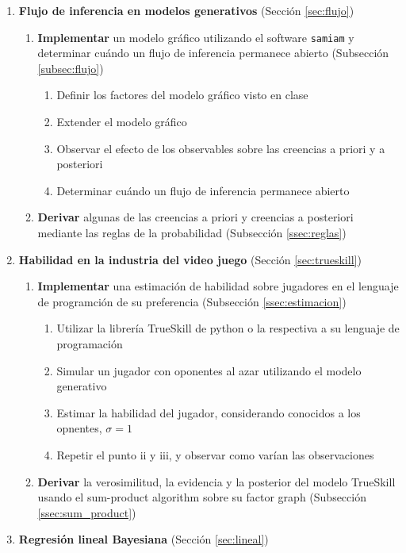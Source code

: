 \documentclass[a4paper,10pt]{article}
\begin{document}
\begin{enumerate}
 \item \textbf{Flujo de inferencia en modelos generativos} (Secci\'on \ref{sec:flujo})
 \begin{enumerate}
  \item \textbf{Implementar} un modelo gr\'afico utilizando el software \texttt{samiam} y determinar cuándo un flujo de inferencia permanece abierto (Subsecci\'on \ref{subsec:flujo})
  \begin{enumerate}[i]
  \item Definir los factores del modelo gr\'afico visto en clase
  \item Extender el modelo gr\'afico
  \item Observar el efecto de los observables sobre las creencias a priori y a posteriori
  \item Determinar cu\'ando un flujo de inferencia permanece abierto
 \end{enumerate}
  \item \textbf{Derivar} algunas de las creencias a priori y creencias a posteriori mediante las reglas de la probabilidad (Subsecci\'on \ref{ssec:reglas})
 \end{enumerate}
 \item \textbf{Habilidad en la industria del video juego} (Secci\'on \ref{sec:trueskill})
 \begin{enumerate}
  \item \textbf{Implementar} una estimaci\'on de habilidad sobre jugadores en el lenguaje de programci\'on de su preferencia (Subsecci\'on \ref{ssec:estimacion})
  \begin{enumerate}[i]
  \item Utilizar la librer\'ia TrueSkill de python o la respectiva a su lenguaje de programaci\'on
  \item Simular un jugador con oponentes al azar utilizando el modelo generativo
  \item Estimar la habilidad del jugador, considerando conocidos a los opnentes, $\sigma=1$
  \item Repetir el punto ii y iii, y observar como var\'ian las observaciones 
 \end{enumerate}
  \item \textbf{Derivar} la verosimilitud, la evidencia y la posterior del modelo TrueSkill usando el sum-product algorithm sobre su factor graph (Subsecci\'on \ref{ssec:sum_product})
 \end{enumerate} 
 \item \textbf{Regresi\'on lineal Bayesiana} (Secci\'on \ref{sec:lineal})

\end{enumerate}
\end{document}
